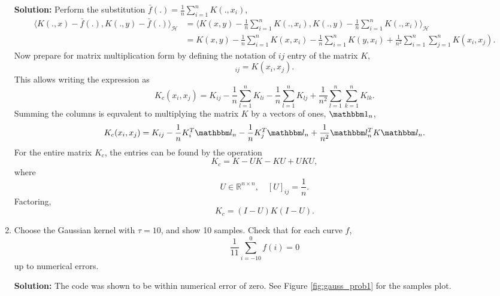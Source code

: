 \documentclass{article}[12pt]
\begin{document}
\begin{enumerate}
	\textbf{Solution:} Perform the substitution $\bar f (.) = \frac{1}{n} \sum^{n}_{i=1} K(., x_i)$,
	\begin{equation}
		\begin{aligned}
			\langle K(., x) - \bar f(.), K(., y) - \bar f(.) \rangle_{\mathcal H} &= \langle K(x,y) - \frac{1}{n} \sum^{n}_{i=1} K(., x_i) , K(., y) - \frac{1}{n} \sum^{n}_{i=1} K(., x_i)  \rangle_{\mathcal H} \\
											      &= K(x,y) - \frac{1}{n} \sum^{n}_{i=1} K(x, x_i) - \frac{1}{n} \sum^{n}_{i=1} K(y, x_i) + \frac{1}{n^2} \sum^{n}_{i=1} \sum^{n}_{j=1} K(x_i, x_j).        
		\end{aligned}
	\end{equation}
	Now prepare for matrix multiplication form by defining the notation of $ij$ entry of the matrix $K$,
\begin{equation}
	[K]_{ij} = K(x_i, x_j).
\end{equation}
This allows writing the expression as
\begin{equation}
	K_c (x_i, x_j) = K_{ij} - \frac{1}{n} \sum^{n}_{l=1} K_{li} - \frac{1}{n} \sum^{n}_{l=1} K_{lj} + \frac{1}{n^2} \sum^{n}_{l=1} \sum^{n}_{k=1} K_{lk}.
\end{equation}
Summing the columns is equvalent to multiplying the matrix $K$ by a vectors of ones, $\mathbbm 1_n$,
\begin{equation}
	K_c(x_i, x_j) = K_{ij} - \frac{1}{n} K^T_i \mathbbm l_n - \frac{1}{n} K^T_j \mathbbm l_n + \frac{1}{n^2} \mathbbm l_n^T K \mathbbm l_n.   
\end{equation}
For the entire matrix $K_c$, the entries can be found by the operation
\begin{equation}
	K_c = K - UK -KU + UKU,
\end{equation}
where 
\begin{equation}
	U \in \mathbb R^{n \times n}, \quad [U]_{ij} = \frac{1}{n}. 
\end{equation}
Factoring,
\begin{equation}
	K_c = (I-U)K(I-U).
\end{equation}

\item Choose the Gaussian kernel with $\tau=10$, and show 10 samples. Check that for each curve $f$, 
\begin{equation}
\frac{1}{11}\sum_{i=-10}^0 f(i)=0
\end{equation}
up to numerical errors.

\textbf{Solution:} The code was shown to be within numerical error of zero. See Figure \ref{fig:gauss_prob1} for the samples plot.


\end{enumerate}
\end{document}
